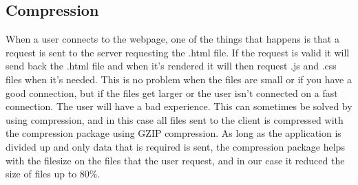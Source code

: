 \subsection{Compression}
When a user connects to the webpage, one of the things that happens is that a request is sent to the server requesting the .html file. If the request is valid it will send back the .html file and when it's rendered it will then request .js and .css files when it's needed. This is no problem when the files are small or if you have a good connection, but if the files get larger or the user isn't connected on a fast connection. The user will have a bad experience. This can sometimes be solved by using compression, and in this case all files sent to the client is compressed with the compression package\cite{Compression:Info} using GZIP compression.\cite{GZIP:Info} As long as the application is divided up and only data that is required is sent, the compression package helps with the filesize on the files that the user request, and in our case it reduced the size of files up to 80\%.